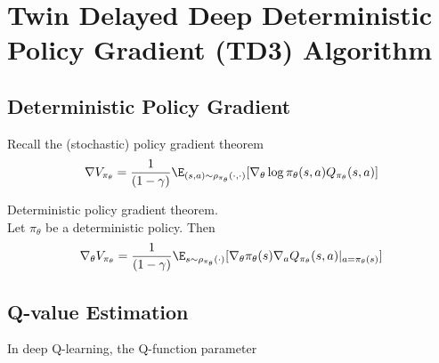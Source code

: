 \section{Twin Delayed Deep Deterministic Policy Gradient (TD3) Algorithm}
\subsection{Deterministic Policy Gradient}
Recall the (stochastic) policy gradient theorem 
\[
  \nabla V_{\pi_\theta} = \frac{1}{(1-\gamma)} \E_{(s,a) \sim \rho_{\pi_\theta}(\cdot, \cdot)} [\nabla_\theta \log \pi_\theta (s,a) Q_{\pi_\theta}(s,a)]
\] 
\begin{theorem}
Deterministic policy gradient theorem. \\ 

Let $\pi_\theta$ be a deterministic policy. Then 
\[
  \nabla_\theta V_{\pi_\theta} = \frac{1}{(1-\gamma)} \E_{s\sim\rho_{\pi_\theta}(\cdot)}[\nabla_\theta \pi_\theta(s) \nabla_a Q_{\pi_\theta}(s,a)|_{a = \pi_\theta(s)}]
\] 

\subsection{Q-value Estimation}
In deep Q-learning, the Q-function parameter 
\end{theorem}

